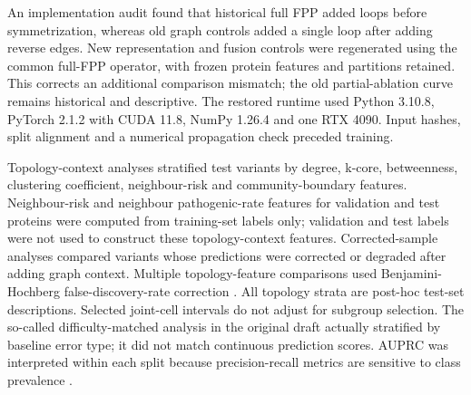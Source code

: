 \documentclass[conference]{IEEEtran}
\begin{document}
An implementation audit found that historical full FPP added loops before symmetrization, whereas old graph controls added a single loop after adding reverse edges. New representation and fusion controls were regenerated using the common full-FPP operator, with frozen protein features and partitions retained. This corrects an additional comparison mismatch; the old partial-ablation curve remains historical and descriptive. The restored runtime used Python 3.10.8, PyTorch 2.1.2 with CUDA 11.8, NumPy 1.26.4 and one RTX 4090. Input hashes, split alignment and a numerical propagation check preceded training.

Topology-context analyses stratified test variants by degree, k-core, betweenness, clustering coefficient, neighbour-risk and community-boundary features. Neighbour-risk and neighbour pathogenic-rate features for validation and test proteins were computed from training-set labels only; validation and test labels were not used to construct these topology-context features. Corrected-sample analyses compared variants whose predictions were corrected or degraded after adding graph context. Multiple topology-feature comparisons used Benjamini-Hochberg false-discovery-rate correction \cite{Benjamini1995FDR}. All topology strata are post-hoc test-set descriptions. Selected joint-cell intervals do not adjust for subgroup selection. The so-called difficulty-matched analysis in the original draft actually stratified by baseline error type; it did not match continuous prediction scores. AUPRC was interpreted within each split because precision-recall metrics are sensitive to class prevalence \cite{Saito2015PrecisionRecall}.
\end{document}
